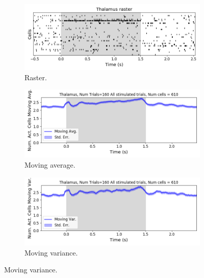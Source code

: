    \begin{figure}[p]
      \begin{subfigure}[h]{\linewidth}
        \includegraphics[width=\linewidth]{figures/conway_maxwell/thalamus_raster_16.png}
        \caption{Raster.}
        \label{fig:thalamus_raster}
      \end{subfigure}
      \begin{subfigure}[h]{\linewidth}
        \includegraphics[width=\linewidth]{figures/conway_maxwell/thalamus_1ms_moving_avg_all_stimulated_trials.png}
        \caption{Moving average.}
        \label{fig:thalamus_moving_avg_num_active_cells}
      \end{subfigure}
      \begin{subfigure}[h]{\linewidth}
        \includegraphics[width=\linewidth]{figures/conway_maxwell/thalamus_1ms_moving_var_all_stimulated_trials.png}
        \caption{Moving variance.}
        \label{fig:thalamus_moving_var_num_active_cells}
      \end{subfigure}

\end{figure}
